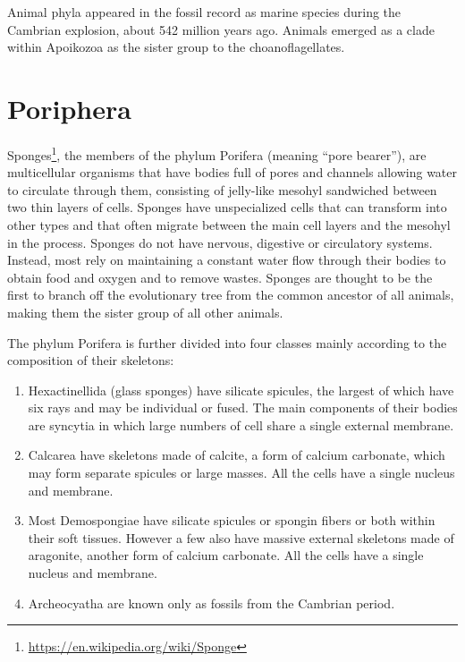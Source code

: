 \documentclass[]{book}
\providecommand{\tightlist}{%
  \setlength{\itemsep}{0pt}\setlength{\parskip}{0pt}}
\let\rmarkdownfootnote\footnote%
\def\footnote{\protect\rmarkdownfootnote}
\renewcommand{\href}[2]{#2\footnote{\url{#1}}}
\theoremstyle{definition}
\theoremstyle{definition}
\theoremstyle{definition}
\theoremstyle{remark}
\begin{document}
Animal phyla appeared in the fossil record as marine species during the
Cambrian explosion, about 542 million years ago. Animals emerged as a
clade within Apoikozoa as the sister group to the choanoflagellates.

\section{Poriphera}\label{poriphera}

\href{https://en.wikipedia.org/wiki/Sponge}{Sponges}, the members of the
phylum Porifera (meaning ``pore bearer''), are multicellular organisms
that have bodies full of pores and channels allowing water to circulate
through them, consisting of jelly-like mesohyl sandwiched between two
thin layers of cells. Sponges have unspecialized cells that can
transform into other types and that often migrate between the main cell
layers and the mesohyl in the process. Sponges do not have nervous,
digestive or circulatory systems. Instead, most rely on maintaining a
constant water flow through their bodies to obtain food and oxygen and
to remove wastes. Sponges are thought to be the first to branch off the
evolutionary tree from the common ancestor of all animals, making them
the sister group of all other animals.

The phylum Porifera is further divided into four classes mainly
according to the composition of their skeletons:

\begin{enumerate}
\def\labelenumi{\arabic{enumi}.}
\tightlist
\item
  Hexactinellida (glass sponges) have silicate spicules, the largest of
  which have six rays and may be individual or fused. The main
  components of their bodies are syncytia in which large numbers of cell
  share a single external membrane.
\item
  Calcarea have skeletons made of calcite, a form of calcium carbonate,
  which may form separate spicules or large masses. All the cells have a
  single nucleus and membrane.
\item
  Most Demospongiae have silicate spicules or spongin fibers or both
  within their soft tissues. However a few also have massive external
  skeletons made of aragonite, another form of calcium carbonate. All
  the cells have a single nucleus and membrane.
\item
  Archeocyatha are known only as fossils from the Cambrian period.
\end{enumerate}
\end{document}
